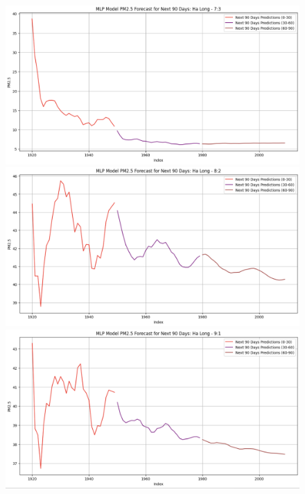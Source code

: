 
\begin{figure}[H]

    \centering
    \begin{minipage}{0.15\textwidth}
    \centering
    \end{minipage}
    \hfill

    \begin{minipage}{0.15\textwidth}
    \centering
    \includegraphics[width=1\textwidth]{img/final/MLP/90D/MLP_7_3_HL_90D.png}
    \end{minipage}
    \hfill
    \begin{minipage}{0.15\textwidth}
    \centering
    \includegraphics[width=1\textwidth]{img/final/MLP/90D/MLP_8_2_HL_90D.png}
    \end{minipage}
    \hfill
    \begin{minipage}{0.15\textwidth}
    \centering
    \includegraphics[width=1\textwidth]{img/final/MLP/90D/MLP_9_1_HL_90D.png}
    \end{minipage}
    \hfill


\end{figure}
